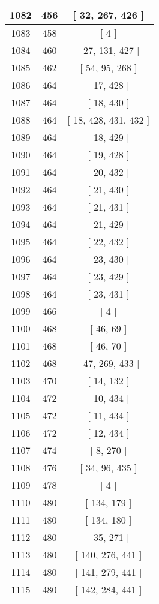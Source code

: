 \begin{center}
\begin{longtable}[H]{|| c c c ||}
\hline
1082 & 456 & [ 32, 267, 426 ] \\ 
\hline
1083 & 458 & [ 4 ] \\ 
\hline
1084 & 460 & [ 27, 131, 427 ] \\ 
\hline
1085 & 462 & [ 54, 95, 268 ] \\ 
\hline
1086 & 464 & [ 17, 428 ] \\ 
\hline
1087 & 464 & [ 18, 430 ] \\ 
\hline
1088 & 464 & [ 18, 428, 431, 432 ] \\ 
\hline
1089 & 464 & [ 18, 429 ] \\ 
\hline
1090 & 464 & [ 19, 428 ] \\ 
\hline
1091 & 464 & [ 20, 432 ] \\ 
\hline
1092 & 464 & [ 21, 430 ] \\ 
\hline
1093 & 464 & [ 21, 431 ] \\ 
\hline
1094 & 464 & [ 21, 429 ] \\ 
\hline
1095 & 464 & [ 22, 432 ] \\ 
\hline
1096 & 464 & [ 23, 430 ] \\ 
\hline
1097 & 464 & [ 23, 429 ] \\ 
\hline
1098 & 464 & [ 23, 431 ] \\ 
\hline
1099 & 466 & [ 4 ] \\ 
\hline
1100 & 468 & [ 46, 69 ] \\ 
\hline
1101 & 468 & [ 46, 70 ] \\ 
\hline
1102 & 468 & [ 47, 269, 433 ] \\ 
\hline
1103 & 470 & [ 14, 132 ] \\ 
\hline
1104 & 472 & [ 10, 434 ] \\ 
\hline
1105 & 472 & [ 11, 434 ] \\ 
\hline
1106 & 472 & [ 12, 434 ] \\ 
\hline
1107 & 474 & [ 8, 270 ] \\ 
\hline
1108 & 476 & [ 34, 96, 435 ] \\ 
\hline
1109 & 478 & [ 4 ] \\ 
\hline
1110 & 480 & [ 134, 179 ] \\ 
\hline
1111 & 480 & [ 134, 180 ] \\ 
\hline
1112 & 480 & [ 35, 271 ] \\ 
\hline
1113 & 480 & [ 140, 276, 441 ] \\ 
\hline
1114 & 480 & [ 141, 279, 441 ] \\ 
\hline
1115 & 480 & [ 142, 284, 441 ] \\ 

\end{longtable}
\end{center}
